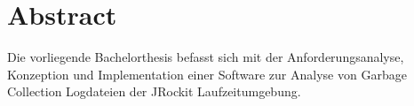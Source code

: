 \chapter*{Abstract}
Die vorliegende Bachelorthesis befasst sich mit der Anforderungsanalyse, Konzeption und Implementation einer Software zur Analyse von Garbage Collection Logdateien der JRockit Laufzeitumgebung.